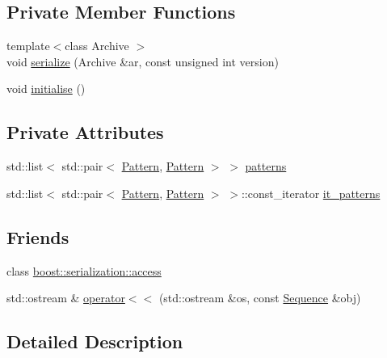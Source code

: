 \subsection*{\-Private \-Member \-Functions}
\begin{DoxyCompactItemize}
\item 
{\footnotesize template$<$class Archive $>$ }\\void \hyperlink{classcryomesh_1_1state_1_1Sequence_a9bcdcbd875329a1a3f42de4fe79e3da5}{serialize} (\-Archive \&ar, const unsigned int version)
\item 
void \hyperlink{classcryomesh_1_1state_1_1Sequence_aa93340ff2f94e135b1d4912d90f11e96}{initialise} ()
\end{DoxyCompactItemize}
\subsection*{\-Private \-Attributes}
\begin{DoxyCompactItemize}
\item 
std\-::list$<$ std\-::pair$<$ \hyperlink{classcryomesh_1_1state_1_1Pattern}{\-Pattern}, \*
\hyperlink{classcryomesh_1_1state_1_1Pattern}{\-Pattern} $>$ $>$ \hyperlink{classcryomesh_1_1state_1_1Sequence_ac01e916df7df88124c2c1f6562ae8d4a}{patterns}
\item 
std\-::list$<$ std\-::pair$<$ \hyperlink{classcryomesh_1_1state_1_1Pattern}{\-Pattern}, \*
\hyperlink{classcryomesh_1_1state_1_1Pattern}{\-Pattern} $>$ $>$\-::const\-\_\-iterator \hyperlink{classcryomesh_1_1state_1_1Sequence_a790c73a269a6a5840faea86b59d25926}{it\-\_\-patterns}
\end{DoxyCompactItemize}
\subsection*{\-Friends}
\begin{DoxyCompactItemize}
\item 
class \hyperlink{classcryomesh_1_1state_1_1Sequence_ac98d07dd8f7b70e16ccb9a01abf56b9c}{boost\-::serialization\-::access}
\item 
std\-::ostream \& \hyperlink{classcryomesh_1_1state_1_1Sequence_ac4237b30080f742f48ab6a1e1a9517c8}{operator$<$$<$} (std\-::ostream \&os, const \hyperlink{classcryomesh_1_1state_1_1Sequence}{\-Sequence} \&obj)
\end{DoxyCompactItemize}


\subsection{\-Detailed \-Description}


